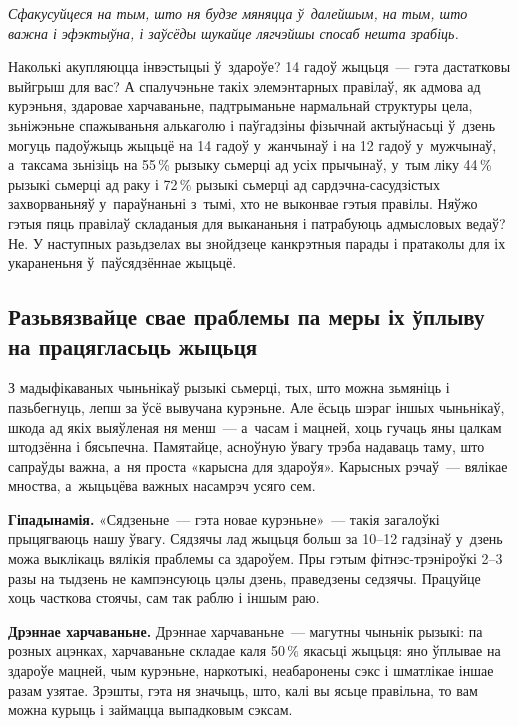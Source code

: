 \emph{Сфакусуйцеся на тым, што ня будзе мяняцца ў~далейшым, на тым, што важна і эфэктыўна, і заўсёды шукайце лягчэйшы спосаб нешта зрабіць.}

Наколькі акупляюцца інвэстыцыі ў~здароўе? 14 гадоў жыцьця~--- гэта дастатковы выйгрыш для вас? А спалучэньне такіх элемэнтарных правілаў, як адмова ад курэньня, здаровае харчаваньне, падтрыманьне нармальнай структуры цела, зьніжэньне спажываньня алькаголю і паўгадзіны фізычнай актыўнасьці ў~дзень могуць падоўжыць жыцьцё на 14 гадоў у~жанчынаў і на 12 гадоў у~мужчынаў, а~таксама зьнізіць на 55\,\% рызыку сьмерці ад усіх прычынаў, у~тым ліку 44\,\% рызыкі сьмерці ад раку і 72\,\% рызыкі сьмерці ад сардэчна-сасудзістых захворваньняў у~параўнаньні з~тымі, хто не выконвае гэтыя правілы. Няўжо гэтыя пяць правілаў складаныя для выкананьня і патрабуюць адмысловых ведаў? Не. У наступных разьдзелах вы знойдзеце канкрэтныя парады і пратаколы для іх укараненьня ў~паўсядзённае жыцьцё.

\subsection*{Разьвязвайце свае праблемы па меры іх ўплыву на працягласьць жыцьця}

З мадыфікаваных чыньнікаў рызыкі сьмерці, тых, што можна зьмяніць і пазьбегнуць, лепш за ўсё вывучана курэньне. Але ёсьць шэраг іншых чыньнікаў, шкода ад якіх выяўленая ня менш~--- а~часам і мацней, хоць гучаць яны цалкам штодзённа і бясьпечна. Памятайце, асноўную ўвагу трэба надаваць таму, што сапраўды важна, а~ня проста «карысна для здароўя». Карысных рэчаў~--- вялікае мноства, а~жыцьцёва важных насамрэч усяго сем. 


\textbf{Гіпадынамія.} «Сядзеньне~--- гэта новае курэньне»~--- такія загалоўкі прыцягваюць нашу ўвагу. Сядзячы лад жыцьця больш за 10--12 гадзінаў у~дзень можа выклікаць вялікія праблемы са здароўем. Пры гэтым фітнэс-трэніроўкі 2--3 разы на тыдзень не кампэнсуюць цэлы дзень, праведзены седзячы. Працуйце хоць часткова стоячы, сам так раблю і іншым раю.

\textbf{Дрэннае харчаваньне.} Дрэннае харчаваньне~--- магутны чыньнік рызыкі: па розных ацэнках, харчаваньне складае каля 50\,\% якасьці жыцьця: яно ўплывае на здароўе мацней, чым курэньне, наркотыкі, неабаронены сэкс і шматлікае іншае разам узятае. Зрэшты, гэта ня значыць, што, калі вы ясьце правільна, то вам можна курыць і займацца выпадковым сэксам.

